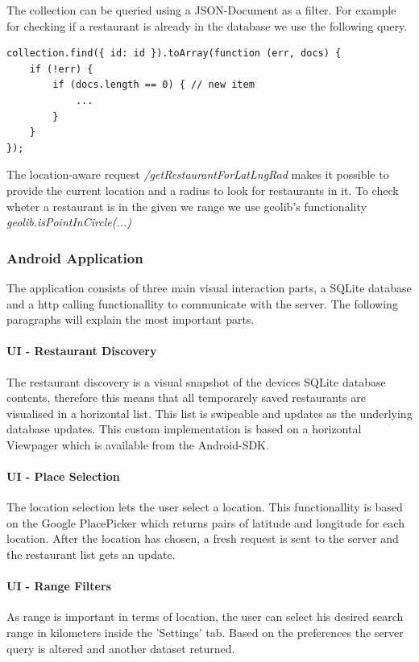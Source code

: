 The collection can be queried using a JSON-Document as a filter. For example for checking if a restaurant is already in the database we use the following query.
\begin{lstlisting}
collection.find({ id: id }).toArray(function (err, docs) {
	if (!err) {
		if (docs.length == 0) { // new item
			...
		} 
	}
});
\end{lstlisting}

The location-aware request \textit{/getRestaurantForLatLngRad} makes it possible to provide the current location and a radius to look for restaurants in it. To check wheter a restaurant is in the given we range we use geolib's functionality \textit{geolib.isPointInCircle(...)}

\subsubsection{Android Application}

The application consists of three main visual interaction parts, a SQLite database and a http calling functionallity to communicate with the server. The following paragraphs will explain the most important parts.

\paragraph{UI - Restaurant Discovery}
The restaurant discovery is a visual snapshot of the devices SQLite database contents, therefore this means that all temporarely saved restaurants are visualised in a horizontal list. This list is swipeable and updates as the underlying database updates. This custom implementation is based on a horizontal Viewpager which is available from the Android-SDK.
\paragraph{UI - Place Selection}
The location selection lets the user select a location. This functionallity is based on the Google PlacePicker which returns pairs of latitude and longitude for each location. After the location has chosen, a fresh request is sent to the server and the restaurant list gets an update.
\paragraph{UI - Range Filters}
As range is important in terms of location, the user can select his desired search range in kilometers inside the 'Settings' tab. Based on the preferences the server query is altered and another dataset returned.
